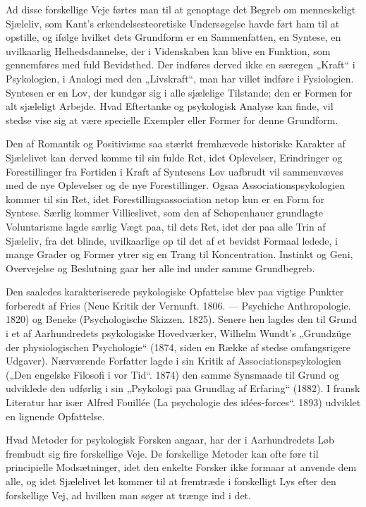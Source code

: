 \documentclass[12pt,a4paper,openany]{book}
\newcommand{\opage}[1]{\marginnote{\footnotesize\textit{[#1]}}}
\begin{document}
Ad disse forskellige Veje førtes man til at genoptage det Begreb
om menneskeligt Sjæleliv, som Kant’s erkendelsesteoretiske Undersøgelse
havde ført ham til at opstille, og ifølge hvilket dets Grundform
er en Sammenfatten, en Syntese, en uvilkaarlig Helhedsdannelse,
der i Videnskaben kan blive en Funktion, som gennemføres
med fuld Bevidsthed. Der indføres derved ikke en særegen
„Kraft“ i Psykologien, i Analogi med den „Livskraft“, man har villet
indføre i Fysiologien. Syntesen er en Lov, der kundgør sig i alle
sjælelige Tilstande; den er Formen for alt sjæleligt Arbejde. Hvad
Eftertanke og psykologisk Analyse kan finde, vil stedse vise sig at
være specielle Exempler eller Former for denne Grundform.

Den af Romantik og Positivisme saa stærkt fremhævede historiske
\opage{47}Karakter af Sjælelivet kan derved komme til sin fulde Ret, idet Oplevelser,
Erindringer og Forestillinger fra Fortiden i Kraft af Syntesens
Lov uafbrudt vil sammenvæves med de nye Oplevelser og de
nye Forestillinger. Ogsaa Associationspsykologien kommer til sin
Ret, idet Forestillingsassociation netop kun er en Form for Syntese.
Særlig kommer Villieslivet, som den af Schopenhauer grundlagte Voluntarisme
lagde særlig Vægt paa, til dets Ret, idet der paa alle Trin
af Sjæleliv, fra det blinde, uvilkaarlige op til det af et bevidst Formaal
ledede, i mange Grader og Former ytrer sig en Trang til Koncentration.
Instinkt og Geni, Overvejelse og Beslutning gaar her alle
ind under samme Grundbegreb.

Den saaledes karakteriserede psykologiske Opfattelse blev paa
vigtige Punkter forberedt af Fries (Neue Kritik der Vernunft. 1806.
--- Psychiche Anthropologie. 1820) og Beneke (Psychologische Skizzen.
1825). Senere hen lagdes den til Grund i et af Aarhundredets
psykologiske Hovedværker, Wilhelm Wundt’s „Grundzüge der physiologischen
Psychologie“ (1874, siden en Række af stedse omfangsrigere
Udgaver). Nærværende Forfatter lagde i sin Kritik af Associationspsykologien
(„Den engelske Filosofi i vor Tid“. 1874) den samme
Synsmaade til Grund og udviklede den udførlig i sin „Psykologi
paa Grundlag af Erfaring“ (1882). I fransk Literatur har især Alfred
Fouillée (La psychologie des idées-forces“. 1893) udviklet en
lignende Opfattelse.

Hvad Metoder for psykologisk Forsken angaar, har der i Aarhundredets
Løb frembudt sig fire forskellige Veje. De forskellige Metoder
kan ofte føre til principielle Modsætninger, idet den enkelte Forsker
ikke formaar at anvende dem alle, og idet Sjælelivet let kommer
til at fremtræde i forskelligt Lys efter den forskellige Vej, ad
hvilken man søger at trænge ind i det.
\end{document}
